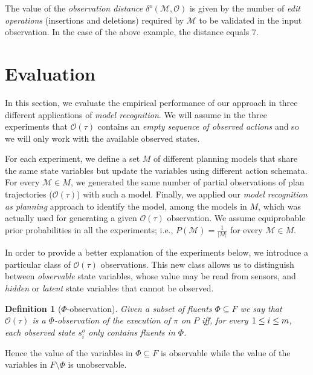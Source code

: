 \documentclass[letterpaper]{article} %
\newtheorem{definition}[theorem]{Definition}
\begin{document}
The value of the {\em observation distance} $\delta^o(\mathcal{M},\mathcal{O})$ is given by the number of {\em edit operations} (insertions and deletions) required by $\mathcal{M}$ to be validated in the input observation. In the case of the above example, the distance equals $7$.



\section{Evaluation}
\label{sec:evaluation}

In this section, we evaluate the empirical performance of our approach in three different applications of {\em model recognition}. We will assume in the three experiments that $\mathcal{O}(\tau)$ contains an \emph{empty sequence of observed actions} and so we will only work with the available observed states.

For each experiment, we define a set $M$ of different planning models that share the same state variables but update the variables using different action schemata. For every $\mathcal{M}\in M$, we generated the same number of partial observations of plan trajectories ($\mathcal{O}(\tau)$) with such a model. Finally, we applied our {\em model recognition as planning} approach to identify the model, among the models in $M$, which was actually used for generating a given $\mathcal{O}(\tau)$ observation. We assume equiprobable prior probabilities in all the experiments; i.e., $P(\mathcal{M}) = \frac{1}{|M|}$ for every $\mathcal{M} \in M$.

In order to provide a better explanation of the experiments below, we introduce a particular class of $\mathcal{O}(\tau)$ observations. This new class allows us to distinguish between {\em observable} state variables, whose value may be read from sensors, and {\em hidden} or {\em latent} state variables that cannot be observed.

\begin{definition}[$\Phi$-observation]
Given a subset of fluents $\Phi\subseteq F$ we say that $\mathcal{O}(\tau)$ is a $\Phi$-observation of the execution of $\pi$ on $P$ iff, for every ${\small 1\leq i\leq m}$, each observed state $s_i^o$ only contains fluents in $\Phi$.
\end{definition}

Hence the value of the variables in $\Phi\subseteq F$ is observable while the value of the variables in $F\setminus\Phi$ is unobservable.
\end{document}
